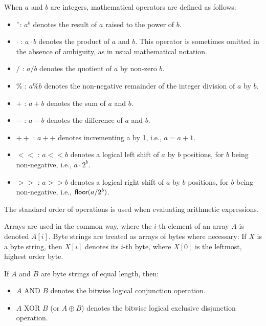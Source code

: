 When $a$ and $b$ are integers, mathematical operators are defined as follows:

\begin{itemize}
    \item \^\ : $a^b$ denotes the result of $a$ raised to the power of $b$.
    
    \item $\cdot$ : $a\cdot b$ denotes the product of $a$ and $b$. This operator is sometimes omitted in the absence of ambiguity, as in usual mathematical notation.
    
    \item $/$ : $a/b$ denotes the quotient of $a$ by non-zero $b$.
    
    \item $\%$ : $a \% b$ denotes the non-negative remainder of the integer division of $a$ by $b$.
    
    \item $+$ : $a+b$ denotes the sum of $a$ and $b$.
    
    \item $-$ : $a-b$ denotes the difference of $a$ and $b$.
    
    \item $++$ : $a++$ denotes incrementing a by 1, i.e., $a = a + 1$.
    
    \item $<<$ : $a << b$ denotes a logical left shift of $a$ by $b$ positions, for $b$ being non-negative, i.e., $a \cdot 2^b$.
    
    \item $>>$ : $a >> b$ denotes a logical right shift of $a$ by $b$ positions, for $b$ being non-negative, i.e., $\textsf{floor}(a/2^b)$.

\end{itemize}

The standard order of operations is used when evaluating arithmetic expressions.

Arrays are used in the common way, where the $i$-th element of an array $A$ is denoted $A[i]$. Byte strings are treated as arrays of bytes where necessary: If $X$ is a byte string, then $X[i]$ denotes its $i$-th byte, where $X[0]$ is the leftmost, highest order byte.

If $A$ and $B$ are byte strings of equal length, then:

\begin{itemize}
    \item $A$ AND $B$ denotes the bitwise logical conjunction operation.

    \item $A$ XOR $B$ (or $A \oplus B$) denotes the bitwise logical exclusive disjunction operation.
\end{itemize}

